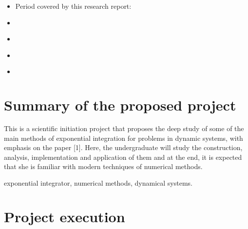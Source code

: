 \documentclass[letterpaper,10pt,english]{jupyterBook}
\begin{document}
\sphinxAtStartPar
{}
\begin{itemize}
\item {} 
\sphinxAtStartPar
Period covered by this research report:

\end{itemize}

\sphinxAtStartPar
{}
\begin{itemize}
\item {} 
\sphinxAtStartPar
{\hyperref[\detokenize{Summary_of_the_proposed_project::doc}]{}}

\item {} 
\sphinxAtStartPar
{\hyperref[\detokenize{Project_execution::doc}]{}}

\item {} 
\sphinxAtStartPar
{\hyperref[\detokenize{gestao_dados::doc}]{}}

\item {} 
\sphinxAtStartPar
{\hyperref[\detokenize{appendix::doc}]{}}

\end{itemize}

\sphinxstepscope


\chapter{Summary of the proposed project}
\label{\detokenize{Summary_of_the_proposed_project:summary-of-the-proposed-project}}\label{\detokenize{Summary_of_the_proposed_project::doc}}
\sphinxAtStartPar
This is a scientific initiation project that proposes the deep study of some of the main methods
of exponential integration for problems in dynamic systems, with emphasis on the paper {[}1{]}.
Here, the undergraduate will study the construction, analysis, implementation and application
of them and at the end, it is expected that she is familiar with modern techniques of numerical
methods.

\sphinxAtStartPar
{} exponential integrator, numerical methods, dynamical systems.

\sphinxstepscope


\chapter{Project execution}
\label{\detokenize{Project_execution:project-execution}}\label{\detokenize{Project_execution::doc}}
\sphinxstepscope
\end{document}

